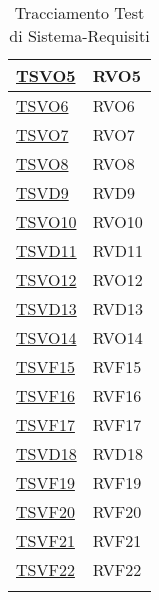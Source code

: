 \begin{longtable}[ht]{|>{\centering}m{5cm}|m{5cm}<{\centering}|}
\hyperlink{TSVO5}{TSVO5} & RVO5\\ \hline
\hyperlink{TSVO6}{TSVO6} & RVO6\\ \hline
\hyperlink{TSVO7}{TSVO7} & RVO7\\ \hline
\hyperlink{TSVO8}{TSVO8} & RVO8\\ \hline
\hyperlink{TSVD9}{TSVD9} & RVD9\\ \hline
\hyperlink{TSVO10}{TSVO10} & RVO10\\ \hline
\hyperlink{TSVD11}{TSVD11} & RVD11\\ \hline
\hyperlink{TSVO12}{TSVO12} & RVO12\\ \hline
\hyperlink{TSVD13}{TSVD13} & RVD13\\ \hline
\hyperlink{TSVO14}{TSVO14} & RVO14\\ \hline
\hyperlink{TSVF15}{TSVF15} & RVF15\\ \hline
\hyperlink{TSVF16}{TSVF16} & RVF16\\ \hline
\hyperlink{TSVF17}{TSVF17} & RVF17\\ \hline
\hyperlink{TSVD18}{TSVD18} & RVD18\\ \hline
\hyperlink{TSVF19}{TSVF19} & RVF19\\ \hline
\hyperlink{TSVF20}{TSVF20} & RVF20\\ \hline
\hyperlink{TSVF21}{TSVF21} & RVF21\\ \hline
\hyperlink{TSVF22}{TSVF22} & RVF22\\ \hline
\caption[Tracciamento Test di Sistema-Requisiti]{Tracciamento Test di Sistema-Requisiti}
\label{tabella:ts-requi}
\end{longtable}
\clearpage

